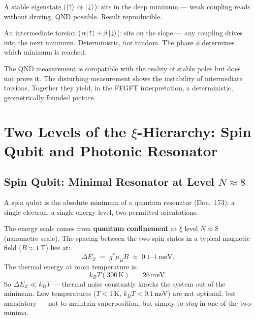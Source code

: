 \begin{keypoint}
A stable eigenstate ($\left|\uparrow\right\rangle$ or $\left|\downarrow\right\rangle$):
sits in the deep minimum --- weak coupling reads
without driving. QND possible. Result reproducible.

An intermediate torsion ($\alpha\left|\uparrow\right\rangle+\beta\left|\downarrow\right\rangle$):
sits on the slope --- any coupling drives
into the next minimum. Deterministic, not random.
The phase $\phi$ determines which minimum is reached.

The QND measurement is compatible with the reality of stable
poles but does not prove it.
The disturbing measurement shows the instability
of intermediate torsions.
Together they yield, in the FFGFT interpretation, a deterministic,
geometrically founded picture.
\end{keypoint}

\section{Two Levels of the \texorpdfstring{$\xi$}{xi}-Hierarchy:
  Spin Qubit and Photonic Resonator}
\label{sec:two-levels}

\subsection{Spin Qubit: Minimal Resonator at Level \texorpdfstring{$N \approx 8$}{N≈8}}

A spin qubit is the absolute minimum of a
quantum resonator (Doc.~173):
a single electron, a single energy level,
two permitted orientations.

The energy scale comes from
\textbf{quantum confinement} at $\xi$ level $N \approx 8$
(nanometre scale).
The spacing between the two spin states
in a typical magnetic field ($B \approx 1$\,T)
lies at:
\begin{equation}
  \Delta E_Z \;=\; g^* \mu_B B \;\approx\; 0.1\text{--}1\,\text{meV}.
\end{equation}
The thermal energy at room temperature is:
\begin{equation}
  k_B T(300\,\text{K}) \;=\; 26\,\text{meV}.
\end{equation}
So $\Delta E_Z \ll k_BT$ --- thermal noise
constantly knocks the system out of the minimum.
Low temperatures ($T < 1$\,K, $k_BT < 0.1$\,meV)
are not optional, but mandatory ---
not to maintain superposition,
but simply to \emph{stay} in one of the two minima.

